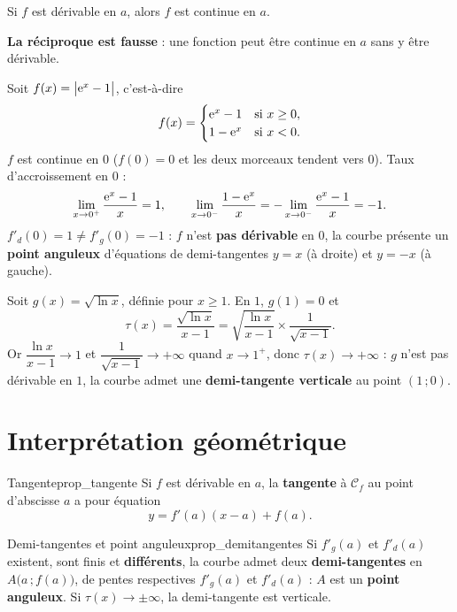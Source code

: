\begin{theoreme}
	Si $f$ est dérivable en $a$, alors $f$ est continue en $a$.

	\textbf{La réciproque est fausse} : une fonction peut être continue en $a$
	sans y être dérivable.
\end{theoreme}

\begin{exemple}
	Soit $f(x)=\bigl|\mathrm{e}^x-1\bigr|$, c'est-à-dire
	\[
	f(x)=
	\begin{cases}
		\mathrm{e}^x-1 & \text{si } x\geq 0,\\
		1-\mathrm{e}^x & \text{si } x<0.
	\end{cases}
	\]
	$f$ est continue en $0$ ($f(0)=0$ et les deux morceaux tendent vers $0$).
	Taux d'accroissement en $0$ :
	\[
	\lim_{x\to 0^+}\frac{\mathrm{e}^x-1}{x}=1,\qquad
	\lim_{x\to 0^-}\frac{1-\mathrm{e}^x}{x}
	=-\lim_{x\to 0^-}\frac{\mathrm{e}^x-1}{x}=-1.
	\]
	$f'_d(0)=1\neq f'_g(0)=-1$ : $f$ n'est \textbf{pas dérivable} en $0$, la
	courbe présente un \textbf{point anguleux} d'équations de demi-tangentes
	$y=x$ (à droite) et $y=-x$ (à gauche).
\end{exemple}

\begin{exemple}
	Soit $g(x)=\sqrt{\ln x}$, définie pour $x\geq 1$. En $1$, $g(1)=0$ et
	\[
	\tau(x)=\frac{\sqrt{\ln x}}{x-1}
	=\sqrt{\frac{\ln x}{x-1}}\times\frac{1}{\sqrt{x-1}}.
	\]
	Or $\dfrac{\ln x}{x-1}\to 1$ et $\dfrac{1}{\sqrt{x-1}}\to+\infty$ quand
	$x\to 1^+$, donc $\tau(x)\to+\infty$ : $g$ n'est pas dérivable en $1$, la
	courbe admet une \textbf{demi-tangente verticale} au point $(1\,;0)$.
\end{exemple}


\section{Interprétation géométrique}

\begin{propriete}{Tangente}{prop_tangente}
	Si $f$ est dérivable en $a$, la \textbf{tangente} à $\mathcal C_f$ au point
	d'abscisse $a$ a pour équation
	\[
	\boxed{\,y=f'(a)(x-a)+f(a).\,}
	\]
\end{propriete}

\begin{propriete}{Demi-tangentes et point anguleux}{prop_demitangentes}
	Si $f'_g(a)$ et $f'_d(a)$ existent, sont finis et \textbf{différents}, la
	courbe admet deux \textbf{demi-tangentes} en $A\bigl(a\,;f(a)\bigr)$, de
	pentes respectives $f'_g(a)$ et $f'_d(a)$ : $A$ est un \textbf{point
	anguleux}. Si $\tau(x)\to\pm\infty$, la demi-tangente est verticale.
\end{propriete}

